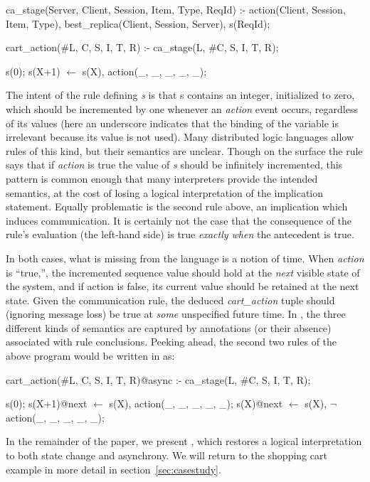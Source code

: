 \begin{Dedalus}
ca_stage(Server, Client, Session, Item, Type, ReqId) :-
  action(Client, Session, Item, Type),
  best_replica(Client, Session, Server),
  s(ReqId);

cart_action(#L, C, S, I, T, R) :-
  ca_stage(L, #C, S, I, T, R);

s(0);
s(X+1) \(\leftarrow\)  s(X), action(_, _, _, _, _);

\end{Dedalus}


The intent of the rule defining {\em s} is that s contains an integer, initialized to
zero, which should be incremented by one whenever an {\em action} event occurs,
regardless of its values (here an underscore indicates that the binding of the variable
is irrelevant because its value is not used).  
Many distributed logic languages allow rules of this kind,
but their semantics are unclear.  Though on the surface the rule says that if {\em action} is true
the value of {\em s} should be infinitely incremented, this pattern is common enough
that many interpreters provide the intended semantics, at the cost of losing a logical
interpretation of the implication statement.  Equally problematic is the second rule above,
an implication which induces communication.  It is certainly not the case that the consequence of the rule's evaluation (the left-hand side) is true {\em exactly when} the antecedent is
true.  

In both cases, what is missing from the language is a notion of time.  When {\em action} is ``true,'',
the incremented sequence value should
hold at the {\em next} visible state of the system, and if action is false, its current
value should be retained at the next state.  Given the communication rule, 
the deduced {\em cart\_action}
tuple should (ignoring message loss) be true at {\em some} unspecified future time.  In \lang,
the three different kinds of semantics are captured by annotations (or their absence) 
associated with rule conclusions.  Peeking ahead, the second two rules of the above program would be written in \lang as:

\begin{Dedalus}

cart_action(#L, C, S, I, T, R)@async :-
  ca_stage(L, #C, S, I, T, R);

s(0);
s(X+1)@next \(\leftarrow\)  s(X), action(_, _, _, _, _);
s(X)@next \(\leftarrow\)  s(X), \(\lnot\) action(_, _, _, _, _);

\end{Dedalus}


In the remainder of the paper, we present \lang, which restores a logical interpretation to
both state change and asynchrony.  We will return to the shopping cart example in more detail 
in section~\ref{sec:casestudy}.

